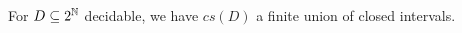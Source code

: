 %
%
%
%
\begin{lemma}\label{ImageDecidableClosedInterval}
  For $D\subseteq 2^{\mathbb{N}}$ decidable, we have $cs(D)$ a finite union of closed intervals. 
\end{lemma}

